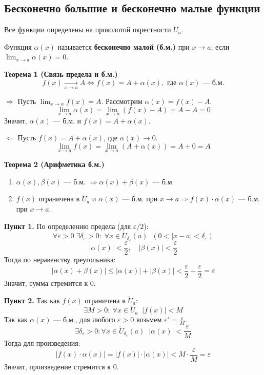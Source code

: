\subsection{Бесконечно большие и бесконечно малые функции}
Все функции определены на проколотой окрестности $\mathring{U}_a$.

\begin{tcolorbox}[title=Определение]
	Функция $\alpha(x)$ называется \textbf{бесконечно малой (б.м.)} при $x\to a$, если $\lim_{x\to a} \alpha(x) = 0$.
\end{tcolorbox}

\textbf{Теорема 1 (Связь предела и б.м.)}
\[ f(x) \xrightarrow[x\to a]{} A \Longleftrightarrow f(x) = A + \alpha(x), \text{ где } \alpha(x) \text{ — б.м.} \]

\begin{tcolorbox}[title=Доказательство]
	$\Rightarrow$ Пусть $\lim_{x \to a} f(x) = A$. Рассмотрим $\alpha(x) = f(x) - A$.
	\[ \lim_{x \to a} \alpha(x) = \lim_{x \to a} (f(x) - A) = A - A = 0 \]
	Значит, $\alpha(x)$ — б.м. и $f(x) = A + \alpha(x)$.
	
	$\Leftarrow$ Пусть $f(x) = A + \alpha(x)$, где $\alpha(x) \to 0$.
	\[ \lim_{x \to a} f(x) = \lim_{x \to a} (A + \alpha(x)) = A + 0 = A \]
\end{tcolorbox}

\textbf{Теорема 2 (Арифметика б.м.)}
\begin{enumerate}
	\item $\alpha(x), \beta(x)$ — б.м. $\Rightarrow \alpha(x) + \beta(x)$ — б.м.
	\item $f(x)$ ограничена в $\mathring{U}_a$ и $\alpha(x)$ — б.м. при $x\to a \Rightarrow f(x) \cdot \alpha(x)$ — б.м. при $x \to a$.
\end{enumerate}

\begin{tcolorbox}[title=Доказательство]
	\textbf{Пункт 1.}
	По определению предела (для $\varepsilon/2$):
	\[ \forall \varepsilon > 0\; \exists \delta_\varepsilon > 0:\; \forall x \in \mathring{U}_{\delta_\varepsilon}(a) \;\; (0 < |x - a| < \delta_\varepsilon) \]
	\[ |\alpha(x)| < \frac{\varepsilon}{2}, \quad |\beta(x)| < \frac{\varepsilon}{2} \]
	Тогда по неравенству треугольника:
	\[ |\alpha(x) + \beta(x)| \leq |\alpha(x)| + |\beta(x)| < \frac{\varepsilon}{2} + \frac{\varepsilon}{2} = \varepsilon \]
	Значит, сумма стремится к 0.

	\textbf{Пункт 2.}
	Так как $f(x)$ ограничена в $\mathring{U}_a$:
	\[ \exists M > 0:\ \forall x \in \mathring{U}_a\;\; |f(x)| < M \]
	Так как $\alpha(x)$ — б.м., для любого $\varepsilon > 0$ возьмем $\varepsilon' = \frac{\varepsilon}{M}$.
	\[ \exists \delta_\varepsilon > 0: \forall x \in \mathring{U}_{\delta_\varepsilon}(a) \;\; |\alpha(x)| < \frac{\varepsilon}{M} \]
	Тогда для произведения:
	\[ |f(x) \cdot \alpha(x)| = |f(x)| \cdot |\alpha(x)| < M \cdot \frac{\varepsilon}{M} = \varepsilon \]
	Значит, произведение стремится к 0.
\end{tcolorbox}

